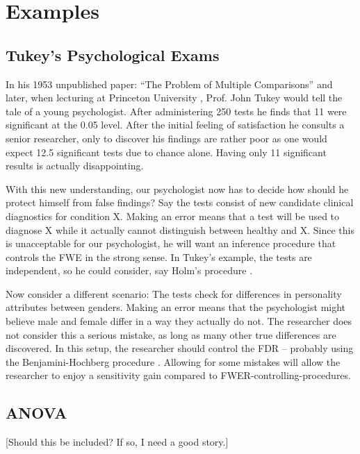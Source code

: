 \documentclass[review,12pt]{article}
\begin{document}
\section{\label{sec:examples}Examples}



\subsection{Tukey's Psychological Exams}
In his 1953 unpublished paper: ``The Problem of Multiple Comparisons'' \citep{benjamini_john_2002} and later, when lecturing at Princeton University \citep{donoho_higher_2004}, Prof. John Tukey would tell the tale of a young psychologist. After administering 250 tests he finds that 11 were significant at the 0.05 level. After the initial feeling of satisfaction he consults a senior researcher, only to discover his findings are rather poor as one  would expect 12.5 significant tests due to chance alone. Having only 11 significant results is actually disappointing.


With this new understanding, our psychologist now has to decide how should he protect himself from false findings? 
Say the tests consist of new candidate clinical diagnostics for condition X. Making an error means that a test will be used to diagnose X while it actually cannot distinguish between healthy and X. Since this is unacceptable for our psychologist, he will want an inference procedure that controls the FWE in the strong sense. 
In Tukey's example, the tests are independent, so he could consider, say Holm's procedure \citep{holm_1979}.


Now consider a different scenario: The tests check for differences in personality attributes between genders. Making an error means that the psychologist might believe male and female differ in a way they actually do not. The researcher does not consider this a serious mistake, as long as many other true differences are discovered. In this setup, the researcher should control the FDR -- probably using the Benjamini-Hochberg procedure \citep{benjamini_controlling_1995}. Allowing for some mistakes will allow the researcher to enjoy a sensitivity gain compared to FWER-controlling-procedures.


\subsection{ANOVA}
[Should this be included? If so, I need a good story.]
\end{document}
